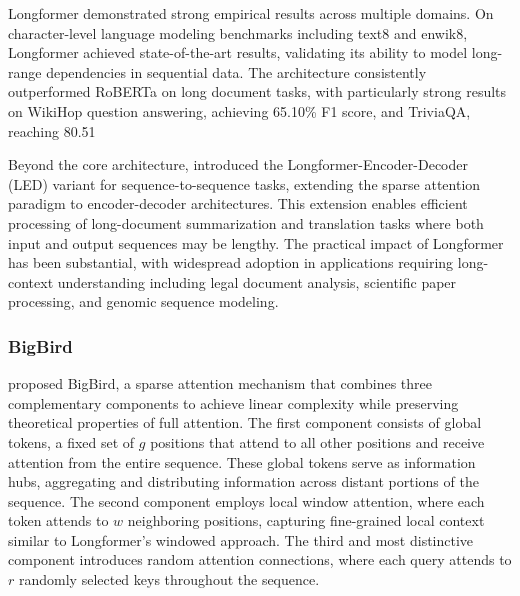 \documentclass[11pt,letterpaper]{article}
\begin{document}
Longformer demonstrated strong empirical results across multiple domains. On character-level language modeling benchmarks including text8 and enwik8, Longformer achieved state-of-the-art results, validating its ability to model long-range dependencies in sequential data. The architecture consistently outperformed RoBERTa on long document tasks, with particularly strong results on WikiHop question answering, achieving 65.10\% F1 score, and TriviaQA, reaching 80.51%

Beyond the core architecture, \cite{beltagy2020longformer} introduced the Longformer-Encoder-Decoder (LED) variant for sequence-to-sequence tasks, extending the sparse attention paradigm to encoder-decoder architectures. This extension enables efficient processing of long-document summarization and translation tasks where both input and output sequences may be lengthy. The practical impact of Longformer has been substantial, with widespread adoption in applications requiring long-context understanding including legal document analysis, scientific paper processing, and genomic sequence modeling.

\subsubsection{BigBird}

\cite{zaheer2020bigbird} proposed BigBird, a sparse attention mechanism that combines three complementary components to achieve linear complexity while preserving theoretical properties of full attention. The first component consists of global tokens, a fixed set of $g$ positions that attend to all other positions and receive attention from the entire sequence. These global tokens serve as information hubs, aggregating and distributing information across distant portions of the sequence. The second component employs local window attention, where each token attends to $w$ neighboring positions, capturing fine-grained local context similar to Longformer's windowed approach. The third and most distinctive component introduces random attention connections, where each query attends to $r$ randomly selected keys throughout the sequence.
\end{document}
